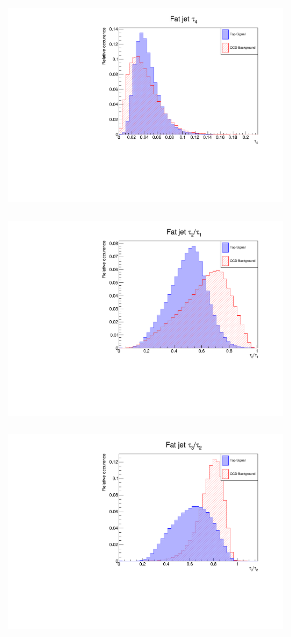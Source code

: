 \documentclass[main]{subfiles} %
\begin{document}
\begin{figure}[H]
\begin{subfigure}[h]{0.49\textwidth}
          \caption{}
         \label{fig:top_distribution_tau3}
     \end{subfigure}
     \begin{subfigure}[h]{0.49\textwidth}
         \centering
         \includegraphics[width=0.8\textwidth]{../Figures/Results/top_distributions/top_tau4_distribution.pdf}
          \caption{}
         \label{fig:top_distribution_tau4}
     \end{subfigure}
     \par\bigskip
     \begin{subfigure}[h]{0.49\textwidth}
         \centering
         \includegraphics[width=0.8\textwidth]{../Figures/Results/top_distributions/top_tau21_distribution.pdf}
          \caption{}
         \label{fig:top_distribution_tau21}
     \end{subfigure}
     \begin{subfigure}[h]{0.49\textwidth}
         \centering
         \includegraphics[width=0.8\textwidth]{../Figures/Results/top_distributions/top_tau32_distribution.pdf}

\end{subfigure}
\end{figure}
\end{document}

